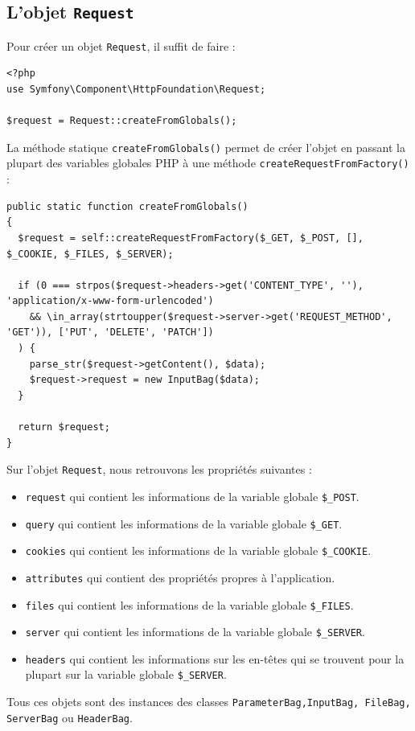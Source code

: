 \documentclass{article}
\begin{document}
\subsection{L'objet {\tt Request}}
Pour créer un objet {\tt Request}, il suffit de faire :
\begin{verbatim}
<?php
use Symfony\Component\HttpFoundation\Request;

$request = Request::createFromGlobals();
\end{verbatim}

La méthode statique {\tt createFromGlobals()} permet de créer l'objet en passant la plupart des variables globales PHP à une méthode {\tt createRequestFromFactory()} :
\begin{verbatim}
public static function createFromGlobals()
{
  $request = self::createRequestFromFactory($_GET, $_POST, [], $_COOKIE, $_FILES, $_SERVER);

  if (0 === strpos($request->headers->get('CONTENT_TYPE', ''), 'application/x-www-form-urlencoded')
    && \in_array(strtoupper($request->server->get('REQUEST_METHOD', 'GET')), ['PUT', 'DELETE', 'PATCH'])
  ) {
    parse_str($request->getContent(), $data);
    $request->request = new InputBag($data);
  }

  return $request;
}
\end{verbatim}

Sur l'objet {\tt Request}, nous retrouvons les propriétés suivantes :

\begin{itemize}
\item {\tt request} qui contient les informations de la variable globale {\tt \$\_POST}.

\item {\tt query} qui contient les informations de la variable globale {\tt \$\_GET}.

\item {\tt cookies} qui contient les informations de la variable globale {\tt \$\_COOKIE}.

\item {\tt attributes} qui contient des propriétés propres à l'application.

\item {\tt files} qui contient les informations de la variable globale {\tt \$\_FILES}.

\item {\tt server} qui contient les informations de la variable globale {\tt \$\_SERVER}.

\item {\tt headers} qui contient les informations sur les en-têtes qui se trouvent pour la plupart sur la variable globale {\tt \$\_SERVER}.
\end{itemize}
Tous ces objets sont des instances des classes {\tt ParameterBag,InputBag, FileBag, ServerBag} ou {\tt HeaderBag}.
\end{document}
